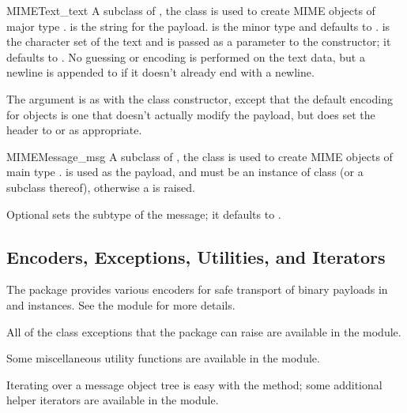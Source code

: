 \begin{classdesc}{MIMEText}{_text}
A subclass of , the  class is used to
create MIME objects of major type .   is the string
for the payload.   is the minor type and defaults to
.   is the character set of the text and is
passed as a parameter to the  constructor; it defaults
to .  No guessing or encoding is performed on the text
data, but a newline is appended to  if it doesn't already
end with a newline.

The  argument is as with the  class
constructor, except that the default encoding for 
objects is one that doesn't actually modify the payload, but does set
the  header to  or
 as appropriate.
\end{classdesc}

\begin{classdesc}{MIMEMessage}{_msg}
A subclass of , the  class is used to
create MIME objects of main type .   is used as
the payload, and must be an instance of class  (or a
subclass thereof), otherwise a  is raised.

Optional  sets the subtype of the message; it defaults
to .
\end{classdesc}

\subsection{Encoders, Exceptions, Utilities, and Iterators}

The  package provides various encoders for safe
transport of binary payloads in  and 
instances.  See the  module for more
details.

All of the class exceptions that the  package can raise
are available in the  module.

Some miscellaneous utility functions are available in the
 module.

Iterating over a message object tree is easy with the
 method; some additional helper iterators are
available in the  module.

